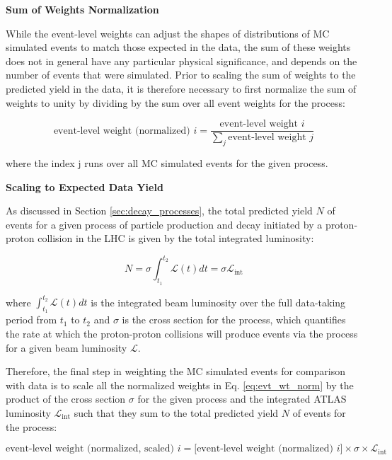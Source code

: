 \medskip\noindent\textbf{Sum of Weights Normalization}

While the event-level weights can adjust the shapes of distributions of MC simulated events to match those expected in the data, the sum of these weights does not in general have any particular physical significance, and depends on the number of events that were simulated. Prior to scaling the sum of weights to the predicted yield in the data, it is therefore necessary to first normalize the sum of weights to unity by dividing by the sum over all event weights for the process: 

\begin{equation}
\label{eq:evt_wt_norm}
\text{event-level weight (normalized) }i = \frac{\text{event-level weight }i }{\sum_j \text{event-level weight }j }
\end{equation}

\noindent where the index j runs over all MC simulated events for the given process.

\medskip\noindent\textbf{Scaling to Expected Data Yield}

As discussed in Section \ref{sec:decay_processes}, the total predicted yield \(N\) of events for a given process of particle production and decay initiated by a proton-proton collision in the LHC is given by the total integrated luminosity:

\begin{equation}
\label{eq:predicted_yield}
N = \sigma\int_{t_1}^{t_2}\mathcal{L}(t)dt = \sigma\mathcal{L}_\text{int}
\end{equation}

\noindent where \(\int_{t_1}^{t_2}\mathcal{L}(t)dt\) is the integrated beam luminosity over the full data-taking period from \(t_1\) to \(t_2\) and \(\sigma\) is the cross section for the process, which quantifies the rate at which the proton-proton collisions will produce events via the process for a given beam luminosity \(\mathcal{L}\).

Therefore, the final step in weighting the MC simulated events for comparison with data is to scale all the normalized weights in Eq. \ref{eq:evt_wt_norm} by the product of the cross section \(\sigma\) for the given process and the integrated ATLAS luminosity \(\mathcal{L}_\text{int}\) such that they sum to the total predicted yield \(N\) of events for the process:

\begin{equation}
\label{eq:evt_wt_norm_scale}
\text{event-level weight (normalized, scaled) }i = \big[\text{event-level weight (normalized) }i\big] \times \sigma \times \mathcal{L}_\text{int}
\end{equation}

